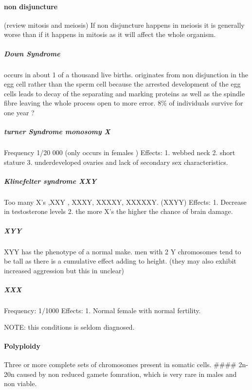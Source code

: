 \documentclass[]{article}
\let\oldparagraph\paragraph
\renewcommand{\paragraph}[1]{\oldparagraph{#1}\mbox{}}
\let\oldsubparagraph\subparagraph
\renewcommand{\subparagraph}[1]{\oldsubparagraph{#1}\mbox{}}
\begin{document}
\hypertarget{non-disjuncture-1}{%
\paragraph{non disjuncture}\label{non-disjuncture-1}}

(review mitosis and meiosis) If non disjuncture happens in meiosis it is
generally worse than if it happens in mitosis as it will affect the
whole organism.

\hypertarget{down-syndrome-1}{%
\subparagraph{Down Syndrome}\label{down-syndrome-1}}

occurs in about 1 of a thousand live births. originates from non
disjunction in the egg cell rather than the sperm cell because the
arrested development of the egg cells leads to decay of the separating
and marking proteins as well as the spindle fibre leaving the whole
process open to more error. 8\% of individuals survive for one year ?

\hypertarget{turner-syndrome-monosomy-x-1}{%
\subparagraph{turner Syndrome monosomy
X}\label{turner-syndrome-monosomy-x-1}}

Frequency 1/20 000 (only occurs in females ) Effects: 1. webbed neck 2.
short stature 3. underdeveloped ovaries and lack of secondary sex
characteristics.

\hypertarget{klinefelter-syndrome-xxy-1}{%
\subparagraph{Klinefelter syndrome
XXY}\label{klinefelter-syndrome-xxy-1}}

Too many X's ,XXY , XXXY, XXXXY, XXXXXY. (XXYY) Effects: 1. Decrease in
testosterone levels 2. the more X's the higher the chance of brain
damage.

\hypertarget{xyy-1}{%
\subparagraph{XYY}\label{xyy-1}}

XYY has the phenotype of a normal make. men with 2 Y chromosomes tend to
be tall as there is a cumulative effect adding to height. (they may also
exhibit increased aggression but this in unclear)

\hypertarget{xxx-1}{%
\subparagraph{XXX}\label{xxx-1}}

Frequency: 1/1000 Effects: 1. Normal female with normal fertility.

NOTE: this conditions is seldom diagnosed.

\hypertarget{polyploidy-3}{%
\paragraph{Polyploidy}\label{polyploidy-3}}

Three or more complete sets of chromosomes present in somatic cells.
\#\#\#\# 2n-20n caused by non reduced gamete fomration, which is very
rare in males and non viable.
\end{document}
